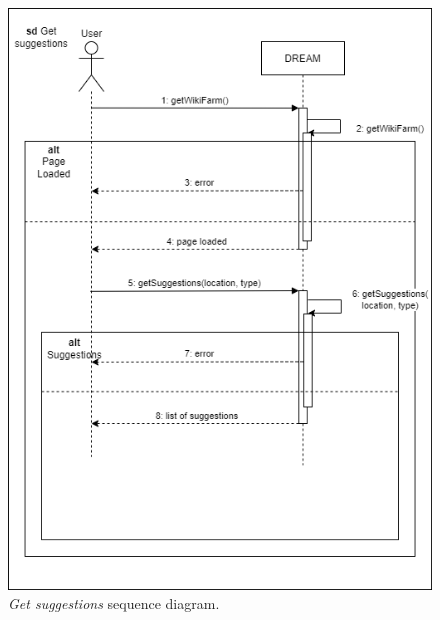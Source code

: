 \begin{figure}[H]
    \centering
    \includegraphics[width=\linewidth]{Images/Use Case/UC10.png}
    \caption{\textit{Get suggestions} sequence diagram.}
\end{figure}
\newpage

